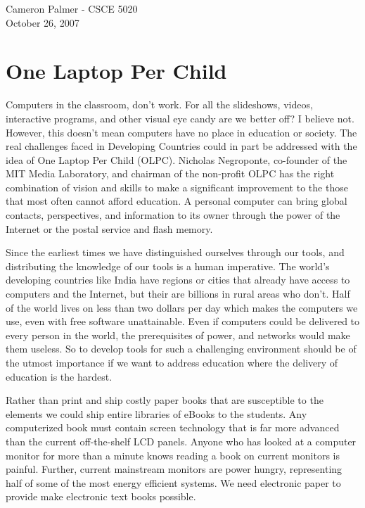 \documentclass[12pt,twoside,letterpaper]{article}
\begin{document}
Cameron Palmer - CSCE 5020\\
October 26, 2007
\section*{One Laptop Per Child}
Computers in the classroom, don't work. For all the slideshows, videos, interactive programs, and other visual eye candy are we better off? I believe not. However, this doesn't mean computers have no place in education or society. The real challenges faced in Developing Countries could in part be addressed with the idea of One Laptop Per Child (OLPC). Nicholas Negroponte, co-founder of the MIT Media Laboratory, and chairman of the non-profit OLPC has the right combination of vision and skills to make a significant improvement to the those that most often cannot afford education. A personal computer can bring global contacts, perspectives, and information to its owner through the power of the Internet or the postal service and flash memory.

Since the earliest times we have distinguished ourselves through our tools, and distributing the knowledge of our tools is a human imperative. The world's developing countries like India have regions or cities that already have access to computers and the Internet, but their are billions in rural areas who don't. Half of the world lives on less than two dollars per day which makes the computers we use, even with free software unattainable. Even if computers could be delivered to every person in the world, the prerequisites of power, and networks would make them useless. So to develop tools for such a challenging environment should be of the utmost importance if we want to address education where the delivery of education is the hardest. 

Rather than print and ship costly paper books that are susceptible to the elements we could ship entire libraries of eBooks to the students. Any computerized book must contain screen technology that is far more advanced than the current off-the-shelf LCD panels. Anyone who has looked at a computer monitor for more than a minute knows reading a book on current monitors is painful. Further, current mainstream monitors are power hungry, representing half of some of the most energy efficient systems. We need electronic paper to provide make electronic text books possible. 
\end{document}
